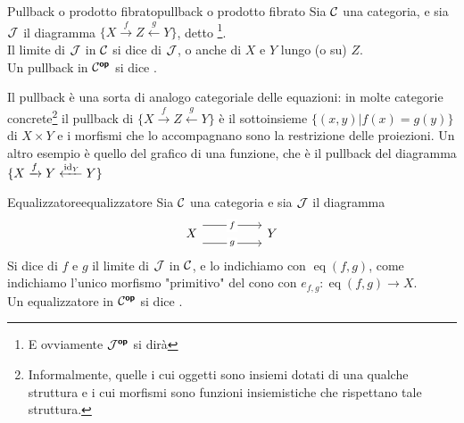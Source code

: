 \documentclass{article}
\renewcommand\C{\mc{C}}
\newcommand\J{\mc{J}}
\newcommand\eq{\operatorname{eq}}
\begin{document}
\begin{definition}{Pullback o prodotto fibrato}{pullback o prodotto fibrato}
    Sia $\C$ una categoria, e sia $\J$ il diagramma $\{ X\xrightarrow{f} Z \xleftarrow{g} Y \}$, detto \footnote{E ovviamente $\J^\op$ si dirà }.\\
    Il limite di $\J$ in $\C$ si dice  di $\J$, o anche  di $X$ e $Y$ lungo (o su) $Z$.\\
    Un pullback in $\C^\op$ si dice .
\end{definition}

Il pullback è una sorta di analogo categoriale delle equazioni: in molte categorie concrete\footnote{Informalmente, quelle i cui oggetti sono insiemi dotati di una qualche struttura e i cui morfismi sono funzioni insiemistiche che rispettano tale struttura.} il pullback di $\{ X\xrightarrow{f} Z \xleftarrow{g} Y \}$ è il sottoinsieme $\{ (x,y) | f(x) = g(y) \}$ di $X\times Y$ e i morfismi che lo accompagnano sono la restrizione delle proiezioni. Un altro esempio è quello del grafico di una funzione, che è il pullback del diagramma $\{ X\xrightarrow{f} Y \xleftarrow{\operatorname{id}_Y} Y \}$

\begin{definition}{Equalizzatore}{equalizzatore}
    Sia $\C$ una categoria e sia $\J$ il diagramma 
    \[\begin{tikzcd}
    	X && Y
    	\arrow["f"{description}, shift left=3, from=1-1, to=1-3]
    	\arrow["g"{description}, shift right=3, from=1-1, to=1-3]
    \end{tikzcd}\]
    Si dice  di $f$ e $g$ il limite di $\J$ in $\C$, e lo indichiamo con $\eq(f,g)$,  come indichiamo l'unico morfismo "primitivo" del cono con $e_{f,g}:\eq(f,g)\to X$.\\
    Un equalizzatore in $\C^\op$ si dice .
\end{definition}
\end{document}
